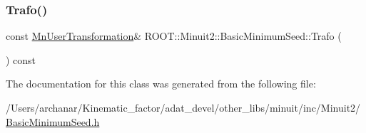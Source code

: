 \subsubsection{\texorpdfstring{Trafo()}{Trafo()}\hspace{0.1cm}{\footnotesize\ttfamily [2/2]}}
{\footnotesize\ttfamily const \mbox{\hyperlink{classROOT_1_1Minuit2_1_1MnUserTransformation}{Mn\+User\+Transformation}}\& R\+O\+O\+T\+::\+Minuit2\+::\+Basic\+Minimum\+Seed\+::\+Trafo (\begin{DoxyParamCaption}{ }\end{DoxyParamCaption}) const\hspace{0.3cm}{\ttfamily [inline]}}



The documentation for this class was generated from the following file\+:\begin{DoxyCompactItemize}
\item 
/\+Users/archanar/\+Kinematic\+\_\+factor/adat\+\_\+devel/other\+\_\+libs/minuit/inc/\+Minuit2/\mbox{\hyperlink{other__libs_2minuit_2inc_2Minuit2_2BasicMinimumSeed_8h}{Basic\+Minimum\+Seed.\+h}}\end{DoxyCompactItemize}
